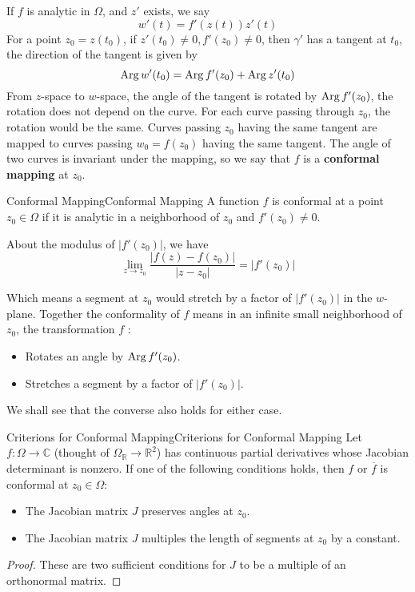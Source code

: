 \documentclass[../main.tex]{subfiles}
\begin{document}
If $f$ is analytic in $\Omega$, and $z'$ exists, we say
\begin{equation}
w'(t) = f'(z(t)) z'(t)
\end{equation}
For a point $z_0=z(t_0)$, if $z'(t_0)\neq 0, f'(z_0)\neq 0$, then $\gamma'$ has a tangent at $t_0$, the direction of the tangent is given by
\begin{equation*}
\operatorname{Arg} w'(t_0) = \operatorname{Arg} f'(z_0) + \operatorname{Arg} z'(t_0)
\end{equation*}
From $z$-space to $w$-space, the angle of the tangent is rotated by $\operatorname{Arg} f'(z_0)$, the rotation does not depend on the curve. For each curve passing through $z_0$, the rotation would be the same. Curves passing $z_0$ having the same tangent are mapped to curves passing $w_0=f(z_0)$ having the same tangent. The angle of two curves is invariant under the mapping, so we say that $f$ is a \textbf{conformal mapping} at $z_0$.

\begin{definition}{Conformal Mapping}{Conformal Mapping}
A function $f$ is conformal at a point $z_0\in\Omega$ if it is analytic in a neighborhood of $z_0$ and $f'(z_0)\neq 0$.
\end{definition}

About the modulus of $\left|f'(z_0)\right|$, we have
\begin{equation*}
\lim_{z \to z_0} \frac{\left|f(z)-f(z_0)\right|}{\left|z-z_0\right|} = \left|f'(z_0)\right|
\end{equation*}

Which means a segment at $z_0$ would stretch by a factor of $\left|f'(z_0)\right|$ in the $w$-plane. Together the conformality of $f$ means in an infinite small neighborhood of $z_0$, the transformation $f$ :
\begin{itemize}
	\item Rotates an angle by $\operatorname{Arg} f'(z_0)$.
	\item Stretches a segment by a factor of $\left|f'(z_0)\right|$.
\end{itemize}

We shall see that the converse also holds for either case.
\begin{theorem}{Criterions for Conformal Mapping}{Criterions for Conformal Mapping}
Let $f: \Omega \rightarrow \mathbb{C}$ (thought of $\Omega_{\mathbb{R}} \rightarrow \mathbb{R}^2$) has continuous partial derivatives whose Jacobian determinant is nonzero. If one of the following conditions holds, then $f$ or $\overline{f}$ is conformal at $z_0\in\Omega$:
\begin{itemize}
\item The Jacobian matrix $J$ preserves angles at $z_0$.
\item The Jacobian matrix $J$ multiples the length of segments at $z_0$ by a constant.
\end{itemize}
\end{theorem}
\begin{proof}
These are two sufficient conditions for $J$ to be a multiple of an orthonormal matrix.
\end{proof}
\end{document}
